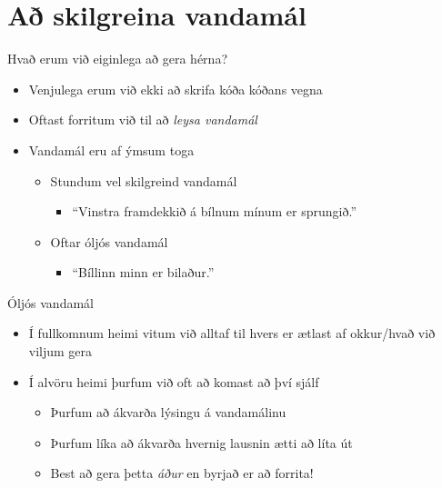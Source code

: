 \documentclass{beamer}
\begin{document}
\section{Að skilgreina vandamál}

\begin{frame}{Hvað erum við eiginlega að gera hérna?}
\pause
\begin{itemize}
 \item Venjulega erum við ekki að skrifa kóða kóðans vegna
 \item Oftast forritum við til að \emph{leysa vandamál}
 \item Vandamál eru af ýmsum toga
 \begin{itemize}
  \item Stundum vel skilgreind vandamál
  \begin{itemize}
   \item ``Vinstra framdekkið á bílnum mínum er sprungið.''
  \end{itemize}
  \item Oftar óljós vandamál
  \begin{itemize}
   \item ``Bíllinn minn er bilaður.''
  \end{itemize}
 \end{itemize}
\end{itemize}
\end{frame}

\begin{frame}{Óljós vandamál}
\begin{itemize}
 \item Í fullkomnum heimi vitum við alltaf til hvers er ætlast af okkur/hvað við viljum gera
 \item Í alvöru heimi þurfum við oft að komast að því sjálf
 \begin{itemize}
  \item Þurfum að ákvarða lýsingu á vandamálinu
  \item Þurfum líka að ákvarða hvernig lausnin ætti að líta út
  \item Best að gera þetta \emph{áður} en byrjað er að forrita!
 \end{itemize}
\end{itemize}
\end{frame}
\end{document}
